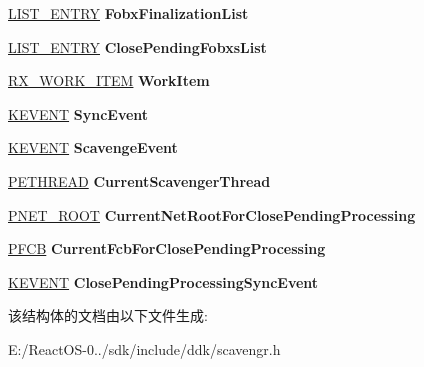 \begin{DoxyCompactItemize}
\hyperlink{struct___l_i_s_t___e_n_t_r_y}{L\+I\+S\+T\+\_\+\+E\+N\+T\+RY} {\bfseries Fobx\+Finalization\+List}
\item 
\mbox{\label{struct___r_d_b_s_s___s_c_a_v_e_n_g_e_r_a612ddd2bcbec6c14f6464986b81ef873}} 
\hyperlink{struct___l_i_s_t___e_n_t_r_y}{L\+I\+S\+T\+\_\+\+E\+N\+T\+RY} {\bfseries Close\+Pending\+Fobxs\+List}
\item 
\mbox{\label{struct___r_d_b_s_s___s_c_a_v_e_n_g_e_r_a2f3eb51f15881cde6e294563fd70eb0f}} 
\hyperlink{struct___r_x___w_o_r_k___i_t_e_m__}{R\+X\+\_\+\+W\+O\+R\+K\+\_\+\+I\+T\+EM} {\bfseries Work\+Item}
\item 
\mbox{\label{struct___r_d_b_s_s___s_c_a_v_e_n_g_e_r_adebc6653d44b05bfa75b8ef851bf5782}} 
\hyperlink{struct___k_e_v_e_n_t}{K\+E\+V\+E\+NT} {\bfseries Sync\+Event}
\item 
\mbox{\label{struct___r_d_b_s_s___s_c_a_v_e_n_g_e_r_aec1ef1df64276b2e7b1d64bebf4bc155}} 
\hyperlink{struct___k_e_v_e_n_t}{K\+E\+V\+E\+NT} {\bfseries Scavenge\+Event}
\item 
\mbox{\label{struct___r_d_b_s_s___s_c_a_v_e_n_g_e_r_a791828e95922686b0ff3efa871a82b53}} 
\hyperlink{struct___e_t_h_r_e_a_d}{P\+E\+T\+H\+R\+E\+AD} {\bfseries Current\+Scavenger\+Thread}
\item 
\mbox{\label{struct___r_d_b_s_s___s_c_a_v_e_n_g_e_r_a0d243743107cc65657c5bc21b575c16b}} 
\hyperlink{struct___n_e_t___r_o_o_t}{P\+N\+E\+T\+\_\+\+R\+O\+OT} {\bfseries Current\+Net\+Root\+For\+Close\+Pending\+Processing}
\item 
\mbox{\label{struct___r_d_b_s_s___s_c_a_v_e_n_g_e_r_aa189e517472b0d4c19620876f73ffafe}} 
\hyperlink{struct___f_c_b}{P\+F\+CB} {\bfseries Current\+Fcb\+For\+Close\+Pending\+Processing}
\item 
\mbox{\label{struct___r_d_b_s_s___s_c_a_v_e_n_g_e_r_a7d5cdde78fa25edce925d62c7378a121}} 
\hyperlink{struct___k_e_v_e_n_t}{K\+E\+V\+E\+NT} {\bfseries Close\+Pending\+Processing\+Sync\+Event}
\end{DoxyCompactItemize}


该结构体的文档由以下文件生成\+:\begin{DoxyCompactItemize}
\item 
E\+:/\+React\+O\+S-\/0../sdk/include/ddk/scavengr.\+h\end{DoxyCompactItemize}
